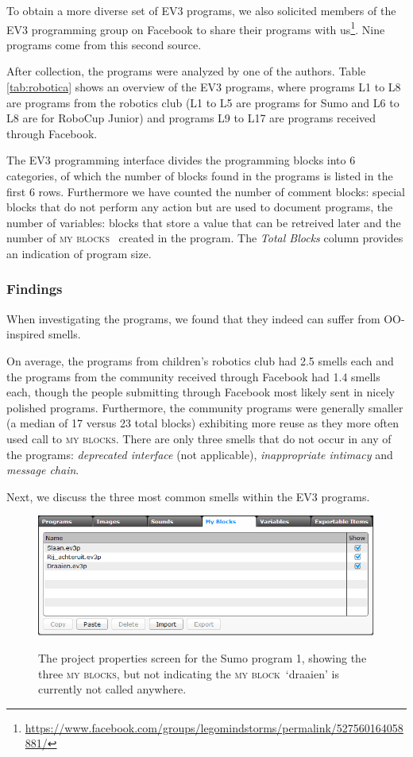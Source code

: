 \documentclass{sig-alternate}
\newcommand{\mbs}{\textsc{my blocks}}
\newcommand{\mb}{\textsc{my block}}
\begin{document}
To obtain a more diverse set of EV3 programs, we also solicited members of the EV3 programming group on Facebook to share their programs with us\footnote{\url{https://www.facebook.com/groups/legomindstorms/permalink/527560164058881/}}. Nine programs come from this second source. 

After collection, the programs were analyzed by one of the authors. Table \ref{tab:robotica} shows an overview of the EV3 programs, where programs L1 to L8 are programs from the robotics club (L1 to L5 are programs for Sumo and L6 to L8 are for RoboCup Junior) and programs L9 to L17  are programs received through Facebook. 

The EV3 programming interface divides the programming blocks into 6 categories, of which the number of blocks found in the programs is listed in the first 6 rows. Furthermore we have counted the number of comment blocks: special blocks that do not perform any action but are used to document programs, the number of variables: blocks that store a value that can be retreived later and the number of \mbs~ created in the program. The \emph{Total Blocks} column provides an indication of program size.  


\subsubsection{Findings}
When investigating the programs, we found that they indeed can suffer from OO-inspired smells. 

On average, the programs from children's robotics club had 2.5 smells each and the programs from the community received through Facebook had 1.4 smells each, though  the people submitting through Facebook most likely sent in nicely polished programs. Furthermore, the community programs were generally smaller (a median of 17 versus 23 total blocks) exhibiting more reuse as they more often used call to \mbs. There are only three smells that do not occur in any of the programs: \emph{deprecated interface} (not applicable), \emph{inappropriate intimacy} and \emph{message chain}.

Next, we discuss the three most common smells within the EV3 programs. 

\begin{figure} [ht]
\caption{The project properties screen for the Sumo program 1, showing the three \mbs, but not indicating the \mb~`draaien' is currently not called anywhere.}
\centering
\includegraphics[width=\columnwidth]{img/overview-small}
\label{fig:overview}
\end{figure}
\end{document}
